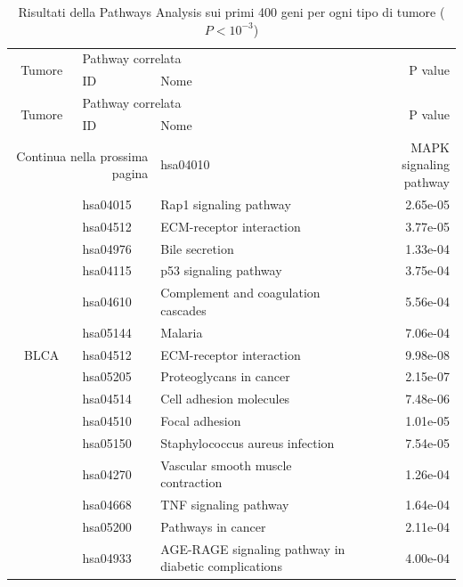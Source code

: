 \begin{longtable}{cllr}
\caption{Risultati della Pathways Analysis sui primi 400 geni per ogni tipo di tumore ($P < 10^{-3}$)} \\
\toprule
\multirow{2}{*}{Tumore} & \multicolumn{2}{l}{Pathway correlata} & \multirow{2}{*}{P value} \\
& ID & Nome \\
\midrule
\endfirsthead
\toprule
\multirow{2}{*}{Tumore} & \multicolumn{2}{l}{Pathway correlata} & \multirow{2}{*}{P value} \\
& ID & Nome \\
\midrule
\endhead
\midrule
\multicolumn{2}{r}{Continua nella prossima pagina}
\endfoot
\bottomrule
\endlastfoot
ACC & hsa04010 & \textcolor{\clrnew}{MAPK signaling pathway} & 2.58e-07\\ 
 & hsa04015 & \textcolor{\clrnew}{Rap1 signaling pathway} & 2.65e-05 \\ 
 & hsa04512 & \textcolor{\clrnew}{ECM-receptor interaction} & 3.77e-05 \\ 
 & hsa04976 & \textcolor{\clrnew}{Bile secretion} & 1.33e-04 \\ 
 & hsa04115 & \textcolor{\clrnew}{p53 signaling pathway} & 3.75e-04 \\ 
 & hsa04610 & \textcolor{\clrnew}{Complement and coagulation cascades} & 5.56e-04 \\ 
 & hsa05144 & \textcolor{\clrnew}{Malaria} & 7.06e-04 \\ 
\midrule 
\rowcolor{\clrmatch}BLCA & hsa04512 & ECM-receptor interaction & 9.98e-08\\ 
 & hsa05205 & \textcolor{\clrnew}{Proteoglycans in cancer} & 2.15e-07 \\ 
 & hsa04514 & \textcolor{\clrnew}{Cell adhesion molecules} & 7.48e-06 \\ 
 \rowcolor{\clrmatch}& hsa04510 & Focal adhesion & 1.01e-05 \\ 
 & hsa05150 & \textcolor{\clrnew}{Staphylococcus aureus infection} & 7.54e-05 \\ 
 & hsa04270 & \textcolor{\clrnew}{Vascular smooth muscle contraction} & 1.26e-04 \\ 
 & hsa04668 & \textcolor{\clrnew}{TNF signaling pathway} & 1.64e-04 \\ 
 & hsa05200 & \textcolor{\clrnew}{Pathways in cancer} & 2.11e-04 \\ 
 & hsa04933 & \textcolor{\clrnew}{AGE-RAGE signaling pathway in diabetic complications} & 4.00e-04 \\ 

\end{longtable}
